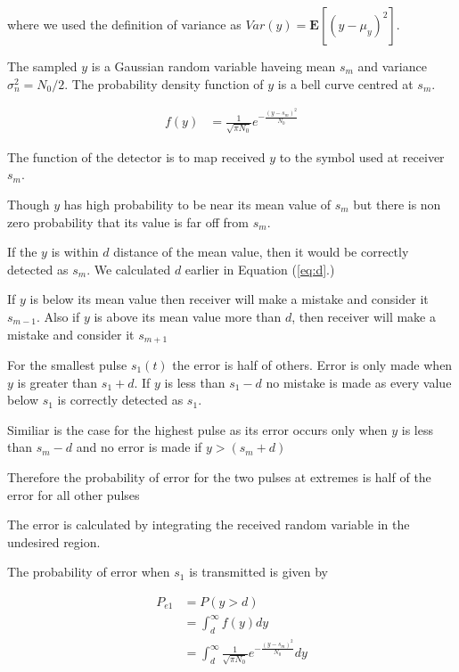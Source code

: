 \documentclass[a4paper]{article}
\numberwithin{equation}{subsection}
\begin{document}
	where we used the definition of variance as $Var(y)=\mathbf{E}[(y-\mu_y)^2] $.
	
	The sampled $y$ is a Gaussian random variable haveing mean $s_m$ and variance $\sigma_n^2=N_0/2$. The probability density function of $y$ is a bell curve centred at $s_m$.
	
	\begin{equation}\label{}
	\begin{aligned}
	f(y)
	&=\frac{1}{\sqrt{\pi N_0}} e^{-\frac{(y-s_m)^2}{N_0}}
	\end{aligned}
	\end{equation}
	
	The function of the detector is to map received $y$ to the symbol used at receiver $s_m$.
	
	Though $y$ has high probability to be near its mean value of $s_m$ but there is non zero probability that its value is far off from $s_m$.
	
	If the $y$ is within $d$ distance of the mean value, then it would be correctly detected as $s_m$. We calculated $d$ earlier in Equation (\ref{eq:d}.)
	
	If $y$ is below its mean value then receiver will make a mistake and consider it $s_{m-1}$. Also if $y$ is above its mean value more than $d$, then receiver will make a mistake and consider it $s_{m+1}$
	
	For the smallest pulse $s_1(t)$ the error is half of others. Error is only made when $y$ is greater than $s_1+d$. If $y$ is less than $s_1-d$ no mistake is made as every value below $s_1$ is correctly detected as $s_1$.
	
	Similiar is the case for the highest pulse as its error occurs only when $y$ is less than $s_m-d$ and no error is made if $y>(s_m+d)$
	
	Therefore the probability of error for the two pulses at extremes is half of the error for all other pulses
	
	The error is calculated by integrating the received random variable in the undesired region.
	
	The probability of error when $s_1$ is transmitted is given by
	
	\begin{equation}\label{eq:pe1}
	\begin{aligned}
	P_{e1}
	&=P(y>d)\\
	&= \int_d^\infty f(y)dy\\
	&= \int_d^\infty \frac{1}{\sqrt{\pi N_0}} e^{-\frac{(y-s_m)^2}{N_0}} dy\\
	\end{aligned}
	\end{equation}
	
\end{document}
